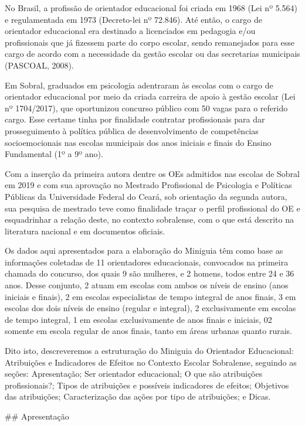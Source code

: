 \documentclass[
  letterpaper,
  DIV=11,
  numbers=noendperiod,
  oneside]{scrreprt}
\begin{document}
No Brasil, a profissão de orientador educacional foi criada em 1968 (Lei
nº 5.564) e regulamentada em 1973 (Decreto-lei nº 72.846). Até então, o
cargo de orientador educacional era destinado a licenciados em pedagogia
e/ou profissionais que já fizessem parte do corpo escolar, sendo
remanejados para esse cargo de acordo com a necessidade da gestão
escolar ou das secretarias municipais (PASCOAL, 2008).

Em Sobral, graduados em psicologia adentraram às escolas com o cargo de
orientador educacional por meio da criada carreira de apoio à gestão
escolar (Lei nº 1704/2017), que oportunizou concurso público com 50
vagas para o referido cargo. Esse certame tinha por finalidade contratar
profissionais para dar prosseguimento à política pública de
desenvolvimento de competências socioemocionais nas escolas municipais
dos anos iniciais e finais do Ensino Fundamental (1º a 9º ano).

Com a inserção da primeira autora dentre os OEs admitidos nas escolas de
Sobral em 2019 e com sua aprovação no Mestrado Profissional de
Psicologia e Políticas Públicas da Universidade Federal do Ceará, sob
orientação da segunda autora, sua pesquisa de mestrado teve como
finalidade traçar o perfil profissional do OE e esquadrinhar a relação
deste, no contexto sobralense, com o que está descrito na literatura
nacional e em documentos oficiais.

Os dados aqui apresentados para a elaboração do Miniguia têm como base
as informações coletadas de 11 orientadores educacionais, convocados na
primeira chamada do concurso, dos quais 9 são mulheres, e 2 homens,
todos entre 24 e 36 anos. Desse conjunto, 2 atuam em escolas com ambos
os níveis de ensino (anos iniciais e finais), 2 em escolas especialistas
de tempo integral de anos finais, 3 em escolas dos dois níveis de ensino
(regular e integral), 2 exclusivamente em escolas de tempo integral, 1
em escolas exclusivamente de anos finais e iniciais, 02 somente em
escola regular de anos finais, tanto em áreas urbanas quanto rurais.

Dito isto, descreveremos a estruturação do Miniguia do Orientador
Educacional: Atribuições e Indicadores de Efeitos no Contexto Escolar
Sobralense, seguindo as seções: Apresentação; Ser orientador
educacional; O que são atribuições profissionais?; Tipos de atribuições
e possíveis indicadores de efeitos; Objetivos das atribuições;
Caracterização das ações por tipo de atribuições; e Dicas.

\#\# Apresentação
\end{document}
